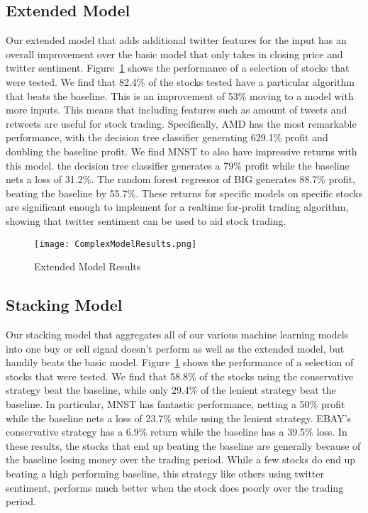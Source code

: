 \documentclass[../thesis.tex]{subfiles}
\begin{document}
\subsection{Extended Model}
Our extended model that adds additional twitter features for the input has an overall improvement over the basic model that only takes in closing price and twitter sentiment. Figure~\ref{complexresults} shows the performance of a selection of stocks that were tested. We find that 82.4\% of the stocks tested have a particular algorithm that beats the baseline. This is an improvement of 53\% moving to a model with more inputs. This means that including features such as amount of tweets and retweets are useful for stock trading. Specifically, AMD has the most remarkable performance, with the decision tree classifier generating 629.1\% profit and doubling the baseline profit. We find MNST to also have impressive returns with this model. the decision tree classifier generates a 79\% profit while the baseline nets a loss of 31.2\%. The random forest regressor of BIG generates 88.7\% profit, beating the baseline by 55.7\%. These returns for specific models on specific stocks are significant enough to implement for a realtime for-profit trading algorithm, showing that twitter sentiment can be used to aid stock trading.

\begin{figure}[h]
\centering
\texttt{[image: ComplexModelResults.png]}
\caption{Extended Model Results \label{overflow}}
\label{complexresults}
\end{figure}

\subsection{Stacking Model}
Our stacking model that aggregates all of our various machine learning models into one buy or sell signal doesn't perform as well as the extended model, but handily beats the basic model. Figure~\ref{complexresults} shows the performance of a selection of stocks that were tested. We find that 58.8\% of the stocks using the conservative strategy beat the baseline, while only 29.4\% of the lenient strategy beat the baseline. In particular, MNST has fantastic performance, netting a 50\% profit while the baseline nets a loss of 23.7\% while using the lenient strategy. EBAY's conservative strategy has a 6.9\% return while the baseline has a 39.5\% loss. In these results, the stocks that end up beating the baseline are generally because of the baseline losing money over the trading period. While a few stocks do end up beating a high performing baseline, this strategy like others using twitter sentiment, performs much better when the stock does poorly over the trading period. 
\end{document}
